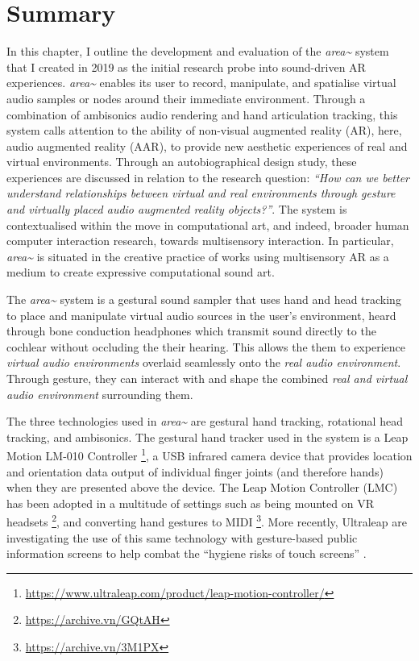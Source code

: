 \section{Summary} \label{sec: area-summary}
In this chapter, I outline the development and evaluation of the \textit{area\textasciitilde{}} system that I created in 2019 as the initial research probe into sound-driven AR experiences. \textit{area\textasciitilde{}} enables its user to record, manipulate, and spatialise virtual audio samples or nodes around their immediate environment. Through a combination of ambisonics audio rendering and hand articulation tracking, this system calls attention to the ability of non-visual augmented reality (AR), here, audio augmented reality (AAR), to provide new aesthetic experiences of real and virtual environments.
Through an autobiographical design study, these experiences are discussed in relation to the research question: \textit{“How can we better understand relationships between virtual and real environments through gesture and virtually placed audio augmented reality objects?”}. The system is contextualised within the move in computational art, and indeed, broader human computer interaction research, towards multisensory interaction. In particular, \textit{area\textasciitilde{}} is situated in the creative practice of works using multisensory AR as a medium to create expressive computational sound art.

The \textit{area\textasciitilde{}} system is a gestural sound sampler that uses hand and head tracking to place and manipulate virtual audio sources in the user’s environment, heard through bone conduction headphones which transmit sound directly to the cochlear without occluding the their hearing. This allows the them to experience \textit{virtual audio environments} overlaid seamlessly onto the \textit{real audio environment}. Through gesture, they can interact with and shape the combined \textit{real and virtual audio environment} surrounding them.

The three technologies used in \textit{area\textasciitilde{}} are gestural hand tracking, rotational head tracking, and ambisonics. The gestural hand tracker used in the system is a Leap Motion LM-010 Controller \footnote{\url{https://www.ultraleap.com/product/leap-motion-controller/}}, a USB infrared camera device that provides location and orientation data output of individual finger joints (and therefore hands) when they are presented above the device. The Leap Motion Controller (LMC) has been adopted in a multitude of settings such as being mounted on VR headsets \footnote{\url{https://archive.vn/GQtAH}}, and converting hand gestures to MIDI \footnote{\url{https://archive.vn/3M1PX}}. More recently, Ultraleap are investigating the use of this same technology with gesture-based public information screens to help combat the “hygiene risks of touch screens” \citeyearpar{ultraleap2020a}.

